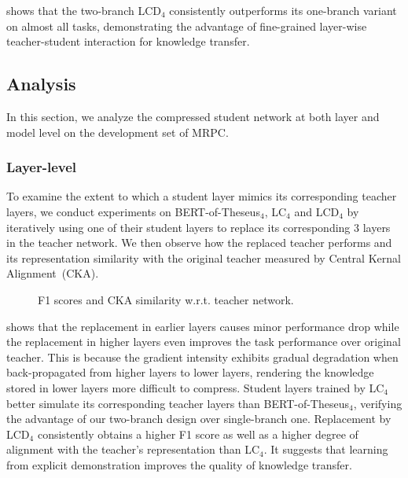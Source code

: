  shows that the two-branch LCD$_4$ consistently outperforms its one-branch variant on almost all tasks, demonstrating the advantage of fine-grained layer-wise teacher-student interaction for 
knowledge transfer.


\subsection{Analysis}
In this section, we analyze the compressed student network at both layer and model level on the development set of MRPC.
\subsubsection{Layer-level}
To examine the extent to which a student layer mimics its corresponding teacher layers, we 
conduct experiments on BERT-of-Theseus$_4$, LC$_4$ and LCD$_4$ by iteratively using one of their student layers to replace its corresponding 3 layers in the teacher network. We then observe how the replaced teacher performs and its representation similarity with the original teacher measured by Central Kernal Alignment~(CKA)\cite{cka}.


\begin{figure}[htb]
\centering
    \caption{F1 scores and CKA similarity w.r.t. teacher network.}
    \label{fig:analysis_1}
\end{figure}

 shows that the replacement in earlier layers causes minor performance drop while the replacement in higher layers even improves the task performance over original teacher. This is because the gradient intensity exhibits gradual degradation when back-propagated from higher layers to lower layers, rendering the knowledge stored in lower layers more difficult to compress. 
Student layers trained by LC$_4$ better simulate its corresponding teacher layers than BERT-of-Theseus$_4$, verifying the advantage of our two-branch design over single-branch one. Replacement by LCD$_4$ consistently obtains a higher F1 score as well as a higher degree of alignment with the teacher's representation than LC$_4$. 
It suggests that learning from explicit demonstration improves the quality of knowledge transfer.


